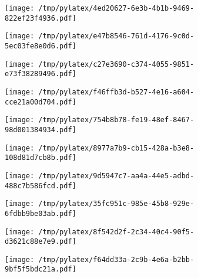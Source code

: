 \documentclass{article}
\begin{document}
\begin{figure}[htbp]
\begin{subfigure}[b]{.3\linewidth}
\texttt{[image: /tmp/pylatex/4ed20627-6e3b-4b1b-9469-822ef23f4936.pdf]}
\end{subfigure}
\begin{subfigure}[b]{.3\linewidth}
\texttt{[image: /tmp/pylatex/e47b8546-761d-4176-9c0d-5ec03fe8e0d6.pdf]}
\end{subfigure}
\begin{subfigure}[b]{.3\linewidth}
\texttt{[image: /tmp/pylatex/c27e3690-c374-4055-9851-e73f38289496.pdf]}
\end{subfigure}
\begin{subfigure}[b]{.3\linewidth}
\texttt{[image: /tmp/pylatex/f46ffb3d-b527-4e16-a604-cce21a00d704.pdf]}
\end{subfigure}
\begin{subfigure}[b]{.3\linewidth}
\texttt{[image: /tmp/pylatex/754b8b78-fe19-48ef-8467-98d001384934.pdf]}
\end{subfigure}
\begin{subfigure}[b]{.3\linewidth}
\texttt{[image: /tmp/pylatex/8977a7b9-cb15-428a-b3e8-108d81d7cb8b.pdf]}
\end{subfigure}
\begin{subfigure}[b]{.3\linewidth}
\texttt{[image: /tmp/pylatex/9d5947c7-aa4a-44e5-adbd-488c7b586fcd.pdf]}
\end{subfigure}
\begin{subfigure}[b]{.3\linewidth}
\texttt{[image: /tmp/pylatex/35fc951c-985e-45b8-929e-6fdbb9be03ab.pdf]}
\end{subfigure}
\begin{subfigure}[b]{.3\linewidth}
\texttt{[image: /tmp/pylatex/8f542d2f-2c34-40c4-90f5-d3621c88e7e9.pdf]}
\end{subfigure}
\begin{subfigure}[b]{.3\linewidth}
\texttt{[image: /tmp/pylatex/f64dd33a-2c9b-4e6a-b2bb-9bf5f5bdc21a.pdf]}
\end{subfigure}
\end{figure}
\end{document}
